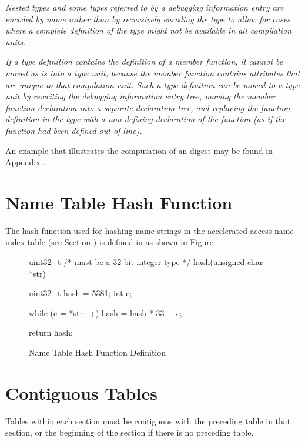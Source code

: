 \textit{Nested types and some types referred to by a debugging 
information entry are encoded by name rather than by recursively 
encoding the type to allow for cases where a complete definition 
of the type might not be available in all compilation units.}

\textit{If a type definition contains the definition of a member function, 
it cannot be moved as is into a type unit, because the member function 
contains attributes that are unique to that compilation unit. 
Such a type definition can be moved to a type unit by rewriting the 
debugging information entry tree, 
moving the member function declaration into a separate declaration tree, 
and replacing the function definition in the type with a non-defining 
declaration of the function (as if the function had been defined out of 
line).}

An example that illustrates the computation of an \MDfive{} digest may be found in 
Appendix .

\section{Name Table Hash Function}
\label{datarep:nametablehashfunction}
The hash function used for hashing name strings in the accelerated 
access name index table (see Section )
is defined in  as shown in 
Figure . 

\begin{figure}[ht]
\begin{nlnlisting}

uint32_t /* must be a 32-bit integer type */
    hash(unsigned char *str)
    {
        uint32_t hash = 5381;
        int c;

        while (c = *str++)
            hash = hash * 33 + c;

        return hash;
    }

\end{nlnlisting}
\caption{Name Table Hash Function Definition}
\label{fig:nametablehashfunctiondefinition}
\end{figure}

\bb
\section{Contiguous Tables}
\label{datarep:contiguoustables}
Tables within each section must be contiguous with the preceding 
table in that section, or the beginning of the section if there 
is no preceding table.
\eb
